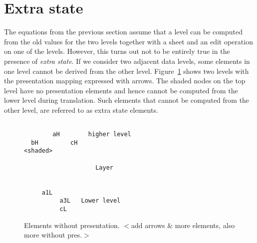 %																
\section{Extra state} \label{sect:extraState}



The equations from the previous section assume that a level can be computed from the old values for the two levels together with a sheet and an edit operation on one of the levels. However, this turns out not to be entirely true in the presence of {\em extra state}. If we consider two adjacent data levels, some elements in one level cannot be derived from the other level. Figure~\ref{layerExtraState} shows two levels with the presentation mapping expressed with arrows. The shaded nodes on the top level have no presentation elements and hence cannot be computed from the lower level during translation. Such elements that cannot be computed from the other level, are referred to as extra state elements.  


%
\begin{figure}
\begin{center}
\begin{center}
\begin{verbatim}

        aH        higher level
  bH         cH
<shaded>

                    Layer

 
     a1L 
          a3L   Lower level
          cL
\end{verbatim}
\end{center}
\caption{Elements without presentation. $<$add arrows \& more elements, also more without pres.$>$}\label{layerExtraState} 
\end{center}
\end{figure}




